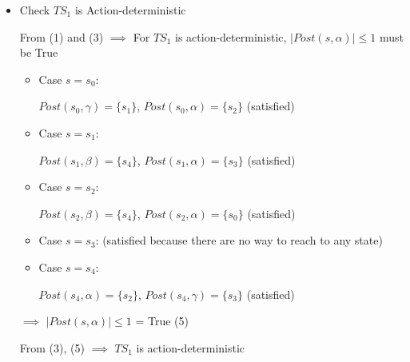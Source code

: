 \documentclass[a4paper,12pt]{article}
\begin{document}
\begin{itemize}
\begin{itemize}
\begin{itemize}
                $\{s' \in S \mid L(s') = A\}$ = $\{\}$

                $\implies$  $\left|Post(s) \cap \{s' \in S \mid L(s') = A\}\right|$ $= \left|\{\}\right|$ $= 0 \leq 1$ (satisfied)
                \item[-] With $A = \{a\}$
                
                $\{s' \in S \mid L(s') = A\}$ = $\{s_0, s_1\}$

                $\implies$ $\left|Post(s) \cap \{s' \in S \mid L(s') = A\}\right|$ $= \left|\{\}\right|$ $= 0 \leq 1$ (satisfied)
                \item[-] With $A = \{b\}$
            
                 $\{s' \in S \mid L(s') = A\}$ = $\{s_3\}$

                 $\implies$ $\left|Post(s) \cap \{s' \in S \mid L(s') = A\}\right|$ $= \left|\{s_3\}\right|$ $= 1 \leq 1$ (satisfied)
                \item[-] With $A = \{a, b\}$ 
                
                 $\{s' \in S \mid L(s') = A\}$ = $\{s_2, s_4\}$

                 $\implies$ $\left|Post(s) \cap \{s' \in S \mid L(s') = A\}\right|$ $= \left|\{s_2\}\right|$ $= 1 \leq 1$ (satisfied)
            \end{itemize}
    \end{itemize}
    $\implies$ $\left|Post(s) \cap \{s' \in S \mid L(s') = A\}\right|$ $\leq 1$ = True (4)

    From (3), (4) $\implies$ $TS_1$ is AP-deterministic

    \item Check $TS_1$ is Action-deterministic
        
    From (1) and (3) $\implies$ For $TS_1$ is action-deterministic, $\left|Post(s, \alpha)\right| \leq 1$ must be True

    \begin{itemize}
        \item Case $s = s_0$:
        
        $Post(s_0, \gamma) = \{s_1\}$, $Post(s_0, \alpha) = \{s_2\}$ (satisfied)
        \item Case $s = s_1$:
        
        $Post(s_1, \beta) = \{s_4\}$, $Post(s_1, \alpha) = \{s_3\}$ (satisfied)
        \item Case $s = s_2$:
        
        $Post(s_2, \beta) = \{s_4\}$, $Post(s_2, \alpha) = \{s_0\}$ (satisfied)
        \item Case $s = s_3$: (satisfied because there are no way to reach to any state)
        \item Case $s = s_4$:
        
        $Post(s_4, \alpha) = \{s_2\}$, $Post(s_4, \gamma) = \{s_3\}$ (satisfied) 
    \end{itemize}
    $\implies$ $\left|Post(s, \alpha)\right| \leq 1$ = True (5)
    
    From (3), (5) $\implies$ $TS_1$ is action-deterministic
\end{itemize}
\end{document}
